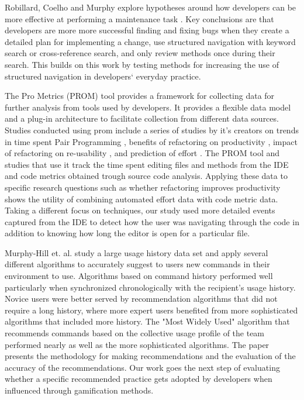 \documentclass{sig-alternate}
\begin{document}
Robillard, Coelho and Murphy explore hypotheses around how developers can be more effective at performing a maintenance task \cite{wbsnipes:Robillard2004How}.  Key conclusions are that developers are more more successful finding and fixing bugs when they create a detailed plan for implementing a change, use structured navigation with keyword search or cross-reference search, and only review methods once during their search.  This builds on this work by testing methods for increasing the use of structured navigation in developers` everyday practice.

The Pro Metrics (PROM) tool provides a framework for collecting data for further analysis from tools used by developers.\cite{Coman2009Casestudy}  It provides a flexible data model and a plug-in architecture to facilitate collection from different data sources.  Studies conducted using prom include a series of studies by it's creators on trends in time spent Pair Programming \cite{Coman2008Investigating}, benefits of refactoring on productivity \cite{Moser2008Case}, impact of refactoring on re-usability \cite{Moser2006Does}, and prediction of effort \cite{Abrahamsson2007Effort}.  The PROM tool and studies that use it track the time spent editing files and methods from the IDE and code metrics obtained trough source code analysis.  Applying these data to specific research questions such as whether refactoring improves productivity \cite{Moser2008Case} shows the utility of combining automated effort data with code metric data.  Taking a different focus on techniques, our study used more detailed events captured from the IDE  to detect how the user was navigating through the code in addition to knowing how long the editor is open for a particular file.

Murphy-Hill et. al. study a large usage history data set and apply several different algorithms to accurately suggest to users new commands in their environment to use.\cite{MurphyHill2012Improving} Algorithms based on command history performed well particularly when synchronized chronologically with the recipient's usage history. Novice users were better served by recommendation algorithms that did not require a long history, where more expert users benefited from more sophisticated algorithms that included more history. The "Most Widely Used" algorithm that recommends commands based on the collective usage profile of the team performed nearly as well as the more sophisticated algorithms. The paper presents the methodology for making recommendations and the evaluation of the accuracy of the recommendations. Our work goes the next step of evaluating whether a specific recommended practice gets adopted by developers when influenced through gamification methods.
\end{document}
